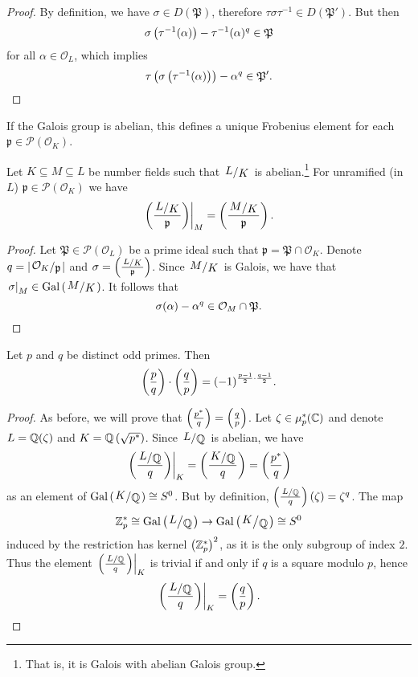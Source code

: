 \begin{proof}
By definition, we have $\sigma \in D(\mathfrak{P})$, therefore
$\tau \sigma \tau^{-1} \in D(\mathfrak{P}')$. But then
\[
\sigma \left(\tau^{-1}(\alpha)\right) - \tau^{-1}(\alpha)^q \in
\mathfrak{P}
\]
for all $\alpha \in \mathcal{O}_L$, which implies
\[
\tau \left(\sigma \left(\tau^{-1}(\alpha)\right)\right) - \alpha^q \in
\mathfrak{P}'. \qedhere
\]
\end{proof}

\begin{opomba}
If the Galois group is abelian, this defines a unique Frobenius
element for each $\mathfrak{p} \in \mathcal{P}(\mathcal{O}_K)$.
\end{opomba}

\begin{lema}
Let $K \subseteq M \subseteq L$ be number fields such that
$\kvoc{L}{K}$ is abelian.\footnote{That is, it is Galois with
abelian Galois group.} For unramified (in $L$)
$\mathfrak{p} \in \mathcal{P}(\mathcal{O}_K)$ we have
\[
\eval{\br{\frac{\kvoc{L}{K}}{\mathfrak{p}}}}{M}{} =
\br{\frac{\kvoc{M}{K}}{\mathfrak{p}}}.
\]
\end{lema}

\begin{proof}
Let $\mathfrak{P} \in \mathcal{P}(\mathcal{O}_L)$ be a prime ideal
such that $\mathfrak{p} = \mathfrak{P} \cap \mathcal{O}_K$. Denote
$q = \abs{\kvoc{\mathcal{O}_K}{\mathfrak{p}}}$ and
$\sigma = \br{\frac{\kvoc{L}{K}}{\mathfrak{p}}}$. Since
$\kvoc{M}{K}$ is Galois, we have that
$\eval{\sigma}{M}{} \in \Gal \br{\kvoc{M}{K}}$. It follows that
\[
\sigma(\alpha) - \alpha^q \in \mathcal{O}_M \cap \mathfrak{P}.
\qedhere
\]
\end{proof}

\begin{izrek}
Let $p$ and $q$ be distinct odd primes. Then
\[
\left(\frac{p}{q}\right) \cdot \left(\frac{q}{p}\right) =
(-1)^{\frac{p-1}{2} \cdot \frac{q-1}{2}}.
\]
\end{izrek}

\begin{proof}
As before, we will prove that
$\left(\frac{p^*}{q}\right) = \left(\frac{q}{p}\right)$. Let
$\zeta \in \mu_p^*(\mathbb{C})$ and denote $L = \mathbb{Q}(\zeta)$ and
$K = \mathbb{Q} \left(\sqrt{p^*}\right)$. Since $\kvoc{L}{\Q}$ is abelian, we have
\[
\eval{\br{\frac{\kvoc{L}{\Q}}{q}}}{K}{} =
\br{\frac{\kvoc{K}{\Q}}{q}} =
\br{\frac{p^*}{q}}
\]
as an element of $\Gal \br{\kvoc{K}{\Q}} \cong S^0$. But by
definition, $\br{\frac{\kvoc{L}{\Q}}{q}}(\zeta) = \zeta^q$. The map
\[
\Z_p^* \cong \Gal \br{\kvoc{L}{\Q}} \to
\Gal \br{\kvoc{K}{\Q}} \cong S^0
\]
induced by the restriction has kernel $\left(\mathbb{Z}_p^*\right)^2$, as it is the
only subgroup of index $2$. Thus the element
$\eval{\br{\frac{\kvoc{L}{\Q}}{q}}}{K}{}$ is trivial if and only if
$q$ is a square modulo $p$, hence
\[
\eval{\br{\frac{\kvoc{L}{\Q}}{q}}}{K}{} = \br{\frac{q}{p}}.
\qedhere
\]
\end{proof}

